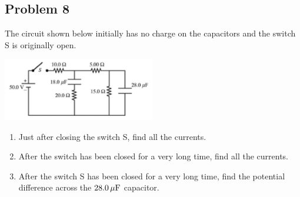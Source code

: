 \subsection*{Problem 8}
The circuit shown below initially has no charge on the capacitors and the switch S is originally open.\\
\centerline{\includegraphics[width=0.5\textwidth]{Images/P8img1.png}}
\begin{enumerate}
    \item Just after closing the switch S, find all the currents.
    \item After the switch has been closed for a very long time,
    find all the currents.
    \item After the switch S has been closed for a very long time,
    find the potential difference across the $28.0\,\mathrm{\mu F}$ capacitor.
\end{enumerate}